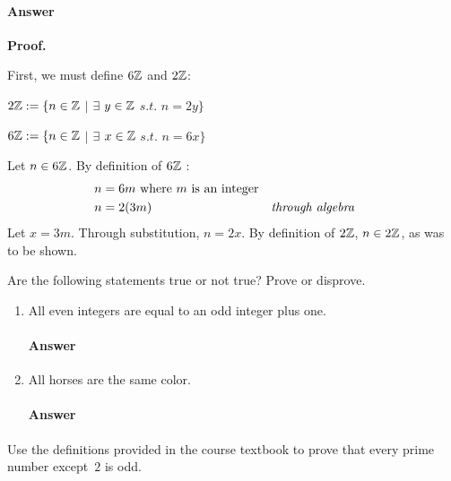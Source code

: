 \documentclass{article}
\begin{document}
\paragraph{Answer} 

\textbf{Proof.}

First, we must define $6{\mathbb Z}$ and $2{\mathbb Z}$:

$2{\mathbb Z} := \{ n \in {\mathbb Z} $ $|$ $ \exists $ $y \in {\mathbb Z} $ $s.t.$ $n=2y \}$

$6{\mathbb Z} := \{ n \in {\mathbb Z} $ $|$ $ \exists $ $x \in {\mathbb Z} $ $s.t.$ $n=6x \}$

Let $n \in 6{\mathbb Z}$.  By definition of $6{\mathbb Z}$ :
\begin{align}
    \nonumber n & = 6m \text{ where } m \text{ is an integer} \\
    \nonumber n & = 2(3m) && \text{\emph{through algebra }}
\end{align}
Let $x = 3m$. Through substitution, $n=2x$. By definition of $2{\mathbb Z}$, $n\in 2{\mathbb Z}$, as was to be shown.

\collab{\todo{}}

Are the following statements true or not true?    Prove or disprove.

\begin{enumerate}

    \item All even integers are equal to an odd integer plus one.

        \paragraph{Answer}

    \item All horses are the same color.

        \paragraph{Answer}

\end{enumerate}

 
Use the definitions provided in the course textbook to prove that every prime
number except~$2$ is odd.
\end{document}
